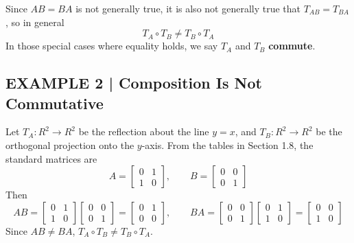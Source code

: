 \documentclass{article}
\theoremstyle{mystyle}
\begin{document}
Since $AB=BA$ is not generally true, it is also not generally true that $T_{AB}=T_{BA}$, so in general
\[
T_A\circ T_B\neq T_B\circ T_A
\]
In those special cases where equality holds, we say $T_A$ and $T_B$ \textbf{commute}.

\subsection*{EXAMPLE 2 | Composition Is Not Commutative}
Let $T_A:R^2\to R^2$ be the reflection about the line $y=x$, and $T_B:R^2\to R^2$ be the orthogonal projection onto the $y$-axis. From the tables in Section 1.8, the standard matrices are
\[
A=\begin{bmatrix}0&1\\1&0\end{bmatrix},\qquad B=\begin{bmatrix}0&0\\0&1\end{bmatrix}
\]
Then
\[
AB=\begin{bmatrix}0&1\\1&0\end{bmatrix}\begin{bmatrix}0&0\\0&1\end{bmatrix}=\begin{bmatrix}0&1\\0&0\end{bmatrix},\qquad
BA=\begin{bmatrix}0&0\\0&1\end{bmatrix}\begin{bmatrix}0&1\\1&0\end{bmatrix}=\begin{bmatrix}0&0\\1&0\end{bmatrix}
\]
Since $AB\neq BA$, $T_A\circ T_B\neq T_B\circ T_A$.
\end{document}
